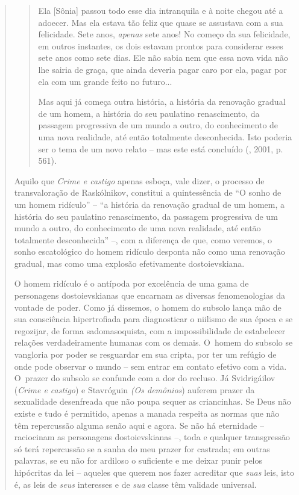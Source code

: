 {\begin{quote}
\begin{quote}
Ela {[}Sônia{]} passou todo esse dia intranquila e à noite chegou até a
adoecer. Mas ela estava tão feliz que quase se assustava com a sua
felicidade. Sete anos, \emph{apenas} sete anos! No começo da sua
felicidade, em outros instantes, os dois estavam prontos para considerar
esses sete anos como sete dias. Ele não sabia nem que essa nova vida não
lhe sairia de graça, que ainda deveria pagar caro por ela, pagar por ela
com um grande feito no futuro...

Mas aqui já começa outra história, a história da renovação gradual de um
homem, a história do seu paulatino renascimento, da passagem progressiva
de um mundo a outro, do conhecimento de uma nova realidade, até então
totalmente desconhecida. Isto poderia ser o tema de um novo relato --
mas este está concluído (, 2001, p. 561).
\end{quote}

Aquilo que \emph{Crime e castigo} apenas esboça, vale dizer, o processo
de transvaloração de Raskólnikov, constitui a quintessência de ``O sonho
de um homem ridículo'' -- ``a história da renovação gradual de um homem,
a história do seu paulatino renascimento, da passagem progressiva de um
mundo a outro, do conhecimento de uma nova realidade, até então
totalmente desconhecida'' --, com a diferença de que, como veremos, o
sonho escatológico do homem ridículo desponta não como uma renovação
gradual, mas como uma explosão efetivamente dostoievskiana.

O homem ridículo é o antípoda por excelência de uma gama de personagens
dostoievskianas que encarnam as diversas fenomenologias da vontade de
poder. Como já dissemos, o homem do subsolo lança mão de sua consciência
hipertrofiada para diagnosticar o niilismo de sua época e se regozijar,
de forma sadomasoquista, com a impossibilidade de estabelecer relações
verdadeiramente humanas com os demais. O~homem do subsolo se vangloria
por poder se resguardar em sua cripta, por ter um refúgio de onde pode
observar o mundo -- sem entrar em contato efetivo com a vida. O~prazer
do subsolo se confunde com a dor do recluso. Já Svidrigáilov
(\emph{Crime e castigo}) e Stavróguin \emph{(Os demônios}) auferem
prazer da sexualidade desenfreada que não poupa sequer as criancinhas.
Se Deus não existe e tudo é permitido, apenas a manada respeita as
normas que não têm repercussão alguma senão aqui e agora. Se não há
eternidade -- raciocinam as personagens dostoievskianas --, toda e
qualquer transgressão só terá repercussão se a sanha do meu prazer for
castrada; em outras palavras, se eu não for ardiloso o suficiente e me
deixar punir pelos hipócritas da lei -- aqueles que querem nos fazer
acreditar que \emph{suas} leis, isto é, as leis de \emph{seus}
interesses e de \emph{sua} classe têm validade universal.


\end{quote}}
